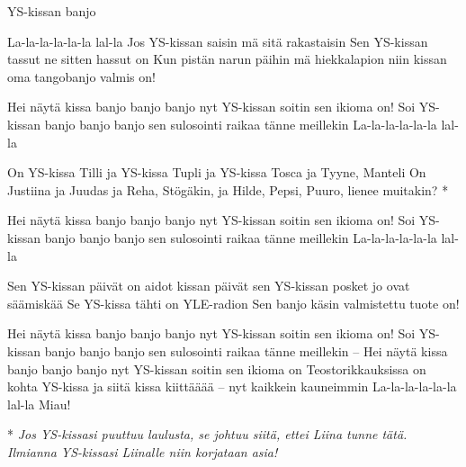 \begin{song}{YS-kissan banjo}


	La-la-la-la-la-la lal-la
	Jos YS-kissan saisin mä sitä rakastaisin
	Sen YS-kissan tassut ne sitten hassut on
	Kun pistän narun päihin mä hiekkalapion
	niin kissan oma tangobanjo valmis on!

	Hei näytä kissa banjo banjo banjo
	nyt YS-kissan soitin sen ikioma on!
	Soi YS-kissan banjo banjo banjo
	sen sulosointi raikaa tänne meillekin
	La-la-la-la-la-la lal-la

	On YS-kissa Tilli ja YS-kissa Tupli
	ja YS-kissa Tosca ja Tyyne, Manteli
	On Justiina ja Juudas ja Reha, Stögäkin,
	ja Hilde, Pepsi, Puuro, lienee muitakin? *

	Hei näytä kissa banjo banjo banjo
	nyt YS-kissan soitin sen ikioma on!
	Soi YS-kissan banjo banjo banjo
	sen sulosointi raikaa tänne meillekin
	La-la-la-la-la-la lal-la

	Sen YS-kissan päivät on aidot kissan päivät
	sen YS-kissan posket jo ovat säämiskää
	Se YS-kissa tähti on YLE-radion
	Sen banjo käsin valmistettu tuote on!

	Hei näytä kissa banjo banjo banjo
	nyt YS-kissan soitin sen ikioma on!
	Soi YS-kissan banjo banjo banjo
	sen sulosointi raikaa tänne meillekin –
	Hei näytä kissa banjo banjo banjo
	nyt YS-kissan soitin sen ikioma on
	Teostorikkauksissa on kohta YS-kissa
	ja siitä kissa kiittääää – nyt kaikkein kauneimmin
	La-la-la-la-la-la lal-la Miau!

	\vspace{2em}

	* \textit{Jos YS-kissasi puuttuu laulusta, se johtuu siitä,
	ettei Liina tunne tätä. Ilmianna YS-kissasi Liinalle niin korjataan asia!}
\end{song}
